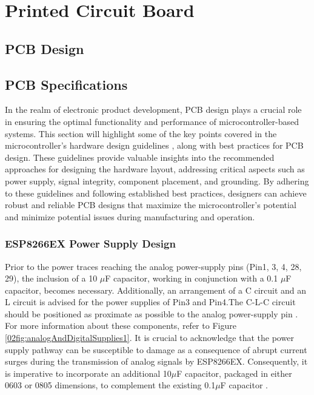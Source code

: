 \newpage

\section{Printed Circuit Board}\label{03Sec:PCB}



    


\subsection{PCB Design}\label{03Sub:PCBDesign}


\subsection{PCB Specifications}\label{03Sub:PCBSpecifications}

In the realm of electronic product development, PCB design plays a crucial role in ensuring the optimal 
functionality and performance of microcontroller-based systems. This section will highlight some of the key 
points covered in the microcontroller's hardware design guidelines \cite{ESP8266HGL}, along with best practices 
for PCB design. These guidelines provide valuable insights into the recommended approaches for designing the hardware 
layout, addressing critical aspects such as power supply, signal integrity, component placement, and grounding. 
By adhering to these guidelines and following established best practices, designers can achieve robust and reliable 
PCB designs that maximize the microcontroller's potential and minimize potential issues during manufacturing and 
operation.


\subsubsection{ESP8266EX Power Supply Design}\label{02SubSub:PowerSupplyDesign}


Prior to the power traces reaching the analog power-supply pins (Pin1, 3, 4, 28, 29), the inclusion of a 10 $\mu$F capacitor, working 
in conjunction with a 0.1 $\mu$F capacitor, becomes necessary. Additionally, an arrangement of a C circuit and an L circuit is advised 
for the power supplies of Pin3 and Pin4.The C-L-C circuit should be positioned as proximate as possible to the analog power-supply pin \cite{ESP8266HGL}. 
For more information about these components, refer to Figure \ref{02fig:analogAndDigitalSupplies1}.
It is crucial to acknowledge that the power supply pathway can be susceptible to damage as a consequence of abrupt current surges 
during the transmission of analog signals by ESP8266EX. Consequently, it is imperative to incorporate an additional 10$\mu$F capacitor, 
packaged in either 0603 or 0805 dimensions, to complement the existing 0.1$\mu$F capacitor \cite{ESP8266HGL}.

